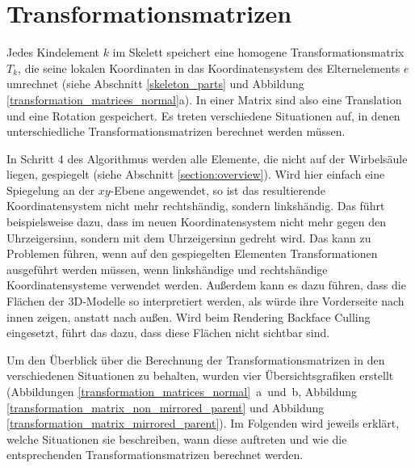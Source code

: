 \section{Transformationsmatrizen}
\label{implementation_detail_matrices}

Jedes Kindelement $k$ im Skelett speichert eine homogene Transformationsmatrix $T_k$, die seine lokalen Koordinaten in das Koordinatensystem des Elternelements $e$ umrechnet (siehe Abschnitt \ref{skeleton_parts} und Abbildung \ref{transformation_matrices_normal}a). In einer Matrix sind also eine Translation und eine Rotation gespeichert.
Es treten verschiedene Situationen auf, in denen unterschiedliche Transformationsmatrizen berechnet werden müssen.

In Schritt $4$ des Algorithmus werden \zb alle Elemente, die nicht auf der Wirbelsäule liegen, gespiegelt (siehe Abschnitt \ref{section:overview}). Wird hier einfach eine Spiegelung an der $xy$-Ebene angewendet, so ist das resultierende Koordinatensystem nicht mehr rechtshändig, sondern linkshändig.
Das führt beispielsweise dazu, dass im neuen Koordinatensystem nicht mehr gegen den Uhrzeigersinn, sondern mit dem Uhrzeigersinn gedreht wird. Das kann zu Problemen führen, wenn auf den gespiegelten Elementen Transformationen ausgeführt werden müssen, \va wenn linkshändige und rechtshändige Koordinatensysteme verwendet werden. Außerdem kann es dazu führen, dass die Flächen der 3D-Modelle so interpretiert werden, als würde ihre Vorderseite nach innen zeigen, anstatt nach außen. Wird beim Rendering Backface Culling \cite{backfaceCulling} eingesetzt, führt das dazu, dass diese Flächen nicht sichtbar sind.

Um den Überblick über die Berechnung der Transformationsmatrizen in den verschiedenen Situationen zu behalten, wurden vier Übersichtsgrafiken erstellt (Abbildungen \mbox{\ref{transformation_matrices_normal} a und b}, Abbildung \ref{transformation_matrix_non_mirrored_parent} und Abbildung \ref{transformation_matrix_mirrored_parent}). 
Im Folgenden wird jeweils erklärt, welche Situationen sie beschreiben, wann diese auftreten und wie die entsprechenden Transformationsmatrizen berechnet werden.

